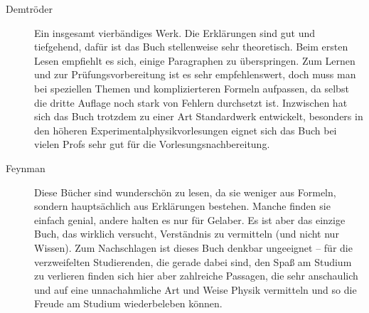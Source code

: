 \begin{description}




\item[Demtröder]{
		Ein insgesamt vierbändiges Werk. Die Erklärungen sind gut und tiefgehend, dafür ist das Buch stellenweise sehr theoretisch. Beim ersten Lesen empfiehlt es sich, einige Paragraphen zu überspringen. Zum Lernen und zur Prüfungsvorbereitung ist es sehr empfehlenswert, doch muss man bei speziellen Themen und komplizierteren Formeln aufpassen, da selbst die dritte Auflage noch stark von Fehlern durchsetzt ist. Inzwischen hat sich das Buch trotzdem zu einer Art Standardwerk entwickelt, besonders in den höheren Experimentalphysikvorlesungen eignet sich das Buch bei vielen Profs sehr gut für die Vorlesungsnachbereitung.}

\item[Feynman]{
		Diese Bücher sind wunderschön zu lesen, da sie weniger aus Formeln, sondern hauptsächlich aus Erklärungen bestehen. Manche finden sie einfach genial, andere halten es nur für Gelaber. Es ist aber das einzige Buch, das wirklich versucht, Verständnis zu vermitteln (und nicht nur Wissen). Zum Nachschlagen ist dieses Buch denkbar ungeeignet -- für die verzweifelten Studierenden, die gerade dabei sind, den Spaß am Studium zu verlieren finden sich hier aber zahlreiche Passagen, die sehr anschaulich und auf eine unnachahmliche Art und Weise Physik vermitteln und so die Freude am Studium wiederbeleben können.}


\end{description}
